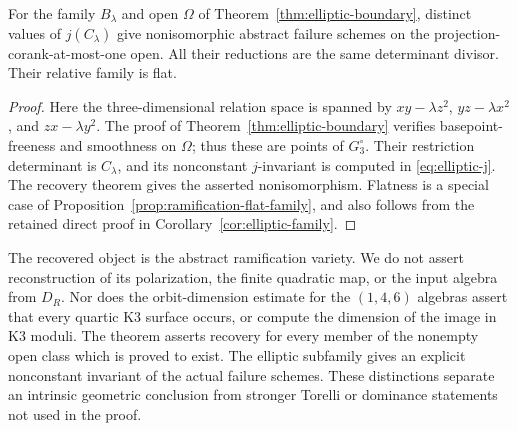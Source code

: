 \begin{corollary}
\label{cor:intrinsic-elliptic-distinction}
For the family $B_\lambda$ and open $\Omega$ of
Theorem~\ref{thm:elliptic-boundary}, distinct values of
$j(C_\lambda)$ give nonisomorphic abstract failure schemes on
the projection-corank-at-most-one open. All their reductions
are the same determinant divisor. Their relative family is flat.
\end{corollary}
\begin{proof}
Here the three-dimensional relation space is spanned by
$xy-\lambda z^2$, $yz-\lambda x^2$, and $zx-\lambda y^2$.
The proof of Theorem~\ref{thm:elliptic-boundary} verifies
basepoint-freeness and smoothness on $\Omega$; thus these are
points of $G_3^\circ$. Their restriction determinant is
$C_\lambda$, and its nonconstant $j$-invariant is computed in
\eqref{eq:elliptic-j}. The recovery theorem gives the asserted
nonisomorphism. Flatness is a special case of
Proposition~\ref{prop:ramification-flat-family}, and also follows
from the retained direct proof in Corollary~\ref{cor:elliptic-family}.
\end{proof}

\begin{remark}\label{rem:intrinsic-recovery-limits}
The recovered object is the abstract ramification variety. We do
not assert reconstruction of its polarization, the finite quadratic
map, or the input algebra from $D_R$. Nor does the orbit-dimension
estimate for the $(1,4,6)$ algebras assert that every quartic K3
surface occurs, or compute the dimension of the image in K3 moduli.
The theorem asserts recovery for every member of the nonempty
open class which is proved to exist. The elliptic subfamily gives
an explicit nonconstant invariant of the actual failure schemes.
These distinctions separate an intrinsic geometric conclusion
from stronger Torelli or dominance statements not used in the proof.
\end{remark}
